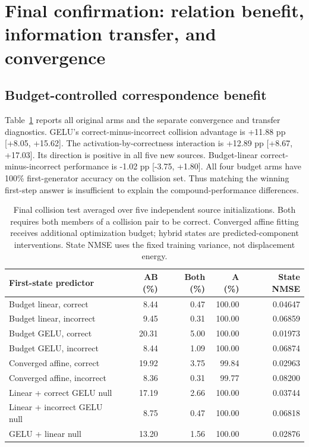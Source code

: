 \section{Final confirmation: relation benefit, information transfer, and convergence}
\subsection{Budget-controlled correspondence benefit}
Table~\ref{tab:final} reports all original arms and the separate convergence and transfer diagnostics.
GELU's correct-minus-incorrect collision advantage is +11.88 pp [+8.05, +15.62].
The activation-by-correctness interaction is +12.89 pp [+8.67, +17.03].
Its direction is positive in all five new sources. Budget-linear correct-minus-incorrect performance is -1.02 pp [-3.75, +1.80].
All four budget arms have 100\% first-generator accuracy on the collision set.
Thus matching the winning first-step answer is insufficient to explain the compound-performance differences.

\begin{table}[ht]\centering\small
\begin{tabular}{lrrrr}\toprule
First-state predictor & AB (\%) & Both (\%) & A (\%) & State NMSE\\\midrule
Budget linear, correct & 8.44 & 0.47 & 100.00 & 0.04647 \\
Budget linear, incorrect & 9.45 & 0.31 & 100.00 & 0.06859 \\
Budget GELU, correct & 20.31 & 5.00 & 100.00 & 0.01973 \\
Budget GELU, incorrect & 8.44 & 1.09 & 100.00 & 0.06874 \\
Converged affine, correct & 19.92 & 3.75 & 99.84 & 0.02963 \\
Converged affine, incorrect & 8.36 & 0.31 & 99.77 & 0.08200 \\
Linear + correct GELU null & 17.19 & 2.66 & 100.00 & 0.03744 \\
Linear + incorrect GELU null & 8.75 & 0.47 & 100.00 & 0.06818 \\
GELU + linear null & 13.20 & 1.56 & 100.00 & 0.02876 \\
\bottomrule\end{tabular}
\caption{Final collision test averaged over five independent source initializations. Both requires both members of a collision pair to be correct. Converged affine fitting receives additional optimization budget; hybrid states are predicted-component interventions. State NMSE uses the fixed training variance, not displacement energy.}\label{tab:final}
\end{table}


